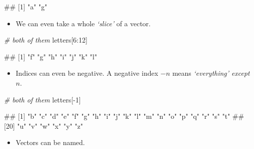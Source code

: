 \documentclass[
]{book}
\newenvironment{Shaded}{\begin{snugshade}}{\end{snugshade}}
\newcommand{\CommentTok}[1]{\textcolor[rgb]{0.56,0.35,0.01}{\textit{#1}}}
\newcommand{\DecValTok}[1]{\textcolor[rgb]{0.00,0.00,0.81}{#1}}
\newcommand{\NormalTok}[1]{#1}
\newcommand{\SpecialCharTok}[1]{\textcolor[rgb]{0.00,0.00,0.00}{#1}}
\providecommand{\tightlist}{%
  \setlength{\itemsep}{0pt}\setlength{\parskip}{0pt}}
\begin{document}
\begin{Shaded}
\begin{Highlighting}[]
\NormalTok{\#\# [1] "a" "g"}
\end{Highlighting}
\end{Shaded}

\begin{itemize}
\tightlist
\item
  We can even take a whole \emph{`slice'} of a vector.
\end{itemize}

\begin{Shaded}
\begin{Highlighting}[]
\CommentTok{\# both of them}
\NormalTok{letters[}\DecValTok{6}\SpecialCharTok{:}\DecValTok{12}\NormalTok{]}
\end{Highlighting}
\end{Shaded}

\begin{Shaded}
\begin{Highlighting}[]
\NormalTok{\#\# [1] "f" "g" "h" "i" "j" "k" "l"}
\end{Highlighting}
\end{Shaded}

\begin{itemize}
\tightlist
\item
  Indices can even be negative. A negative index \(-n\) means \emph{`everything' except \(n\)}.
\end{itemize}

\begin{Shaded}
\begin{Highlighting}[]
\CommentTok{\# both of them}
\NormalTok{letters[}\SpecialCharTok{{-}}\DecValTok{1}\NormalTok{]}
\end{Highlighting}
\end{Shaded}

\begin{Shaded}
\begin{Highlighting}[]
\NormalTok{\#\#  [1] "b" "c" "d" "e" "f" "g" "h" "i" "j" "k" "l" "m" "n" "o" "p" "q" "r" "s" "t"}
\NormalTok{\#\# [20] "u" "v" "w" "x" "y" "z"}
\end{Highlighting}
\end{Shaded}

\begin{itemize}
\tightlist
\item
  Vectors can be named.
\end{itemize}
\end{document}
